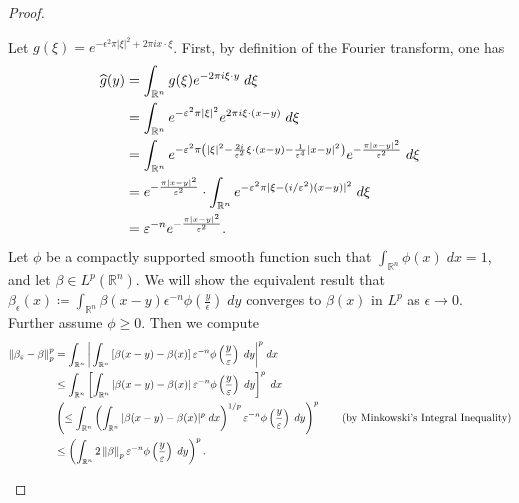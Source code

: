 \documentclass{article}
\numberwithin{equation}{section}
\begin{document}
\begin{proof}
\begin{enumerate}[itemsep =-2pt,label = (\arabic{*})]
\begin{equation*}
			\end{equation*}
			Let $g(\xi) = e^{-\epsilon^{2}\pi |\xi|^{2} + 2\pi i x \cdot \xi}$. First, by definition of the Fourier transform, one has 
			\begin{align*}
				\begin{split}
					\widehat{g}(y) &= \int_{\mathbb{R}^{n}}g(\xi)e^{-2\pi i \xi \cdot y}\;d\xi \\
					&= \int_{\mathbb{R}^{n}}e^{-\varepsilon^{2}\pi |\xi|^{2}}e^{2\pi i \xi \cdot (x  - y)}\;d\xi \\
					&= \int_{\mathbb{R}^{n}}e^{-\varepsilon^{2}\pi\left(|\xi|^{2} - \frac{2i}{\varepsilon^{2}}\xi \cdot (x - y) - \frac{1}{\varepsilon^{4}}|x - y|^{2}\right)}e^{-\frac{\pi |x - y|^{2}}{\varepsilon^{2}}}\;d\xi \\
					&= e^{-\frac{\pi |x - y|^{2}}{\varepsilon^{2}}} \cdot \int_{\mathbb{R}^{n}}e^{-\varepsilon^{2}\pi |\xi - (i/\varepsilon^{2})(x - y)|^{2}}\;d\xi \\
					&= \varepsilon^{-n}e^{-\frac{\pi|x -y|^{2}}{\varepsilon^{2}}}. 
				\end{split}
			\end{align*}
			Let $\phi$ be a compactly supported smooth function such that $\int_{\mathbb{R}^{n}}\phi(x)\;dx = 1$, and let $\beta \in L^{p}(\mathbb{R}^{n})$. We will show the equivalent result that $\beta_{\epsilon}(x) \coloneqq \int_{\mathbb{R}^{n}}\beta(x -y)\epsilon^{-n}\phi\left(\frac{y}{\epsilon}\right)\;dy$ converges to $\beta(x)$ in $L^{p}$ as $\epsilon \to 0$. Further assume $\phi \geq 0$. Then we compute 
			\begin{align*}
				\begin{split}
					\left\Vert \beta_{\varepsilon} - \beta \right\Vert_{p}^{p} &= \int_{\mathbb{R}^{n}}\bigg|\int_{\mathbb{R}^{n}}\left[\beta(x - y) - \beta(x)\right]\varepsilon^{-n}\phi\left(\frac{y}{\varepsilon}\right)\;dy\bigg|^{p}\;dx \\
					&\leq \int_{\mathbb{R}^{n}}\left[\int_{\mathbb{R}^{n}}\left| \beta(x  -y) - \beta(x) \right|\varepsilon^{-n}\phi\left(\frac{y}{\varepsilon}\right)\;dy\right]^{p}\;dx \\
					&\left(\leq \int_{\mathbb{R}^{n}}\left(\int_{\mathbb{R}^{n}}|\beta(x-y) - \beta(x)|^{p}\;dx\right)^{1/p}\varepsilon^{-n}\phi\left(\frac{y}{\varepsilon}\right)\;dy\right)^{p} \qquad (\text{by Minkowski's Integral Inequality}) \\
					&\leq \left(\int_{\mathbb{R}^{n}}2\left\Vert \beta \right\Vert_{p}\varepsilon^{-n}\phi\left(\frac{y}{\varepsilon}\right)\;dy\right)^{p}. 
				\end{split}
			\end{align*}

\end{enumerate}
\end{proof}
\end{document}

